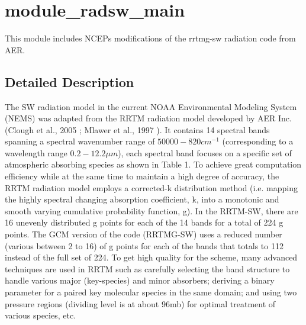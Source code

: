 \hypertarget{group__module__radsw__main}{}\section{module\+\_\+radsw\+\_\+main}
\label{group__module__radsw__main}


This module includes N\+C\+EP\textquotesingle{}s modifications of the rrtmg-\/sw radiation code from A\+ER.  




\subsection{Detailed Description}
The SW radiation model in the current N\+O\+AA Environmental Modeling System (N\+E\+MS) was adapted from the R\+R\+TM radiation model developed by A\+ER Inc. (Clough et al., 2005 \cite{clough_et_al_2005}; Mlawer et al., 1997 \cite{mlawer_et_al_1997}). It contains 14 spectral bands spanning a spectral wavenumber range of $50000-820 cm^{-1}$ (corresponding to a wavelength range $0.2-12.2\mu m$), each spectral band focuses on a specific set of atmospheric absorbing species as shown in Table 1. To achieve great computation efficiency while at the same time to maintain a high degree of accuracy, the R\+R\+TM radiation model employs a corrected-\/k distribution method (i.\+e. mapping the highly spectral changing absorption coefficient, k, into a monotonic and smooth varying cumulative probability function, g). In the R\+R\+T\+M-\/\+SW, there are 16 unevenly distributed g points for each of the 14 bands for a total of 224 g points. The G\+CM version of the code (R\+R\+T\+M\+G-\/\+SW) uses a reduced number (various between 2 to 16) of g points for each of the bands that totals to 112 instead of the full set of 224. To get high quality for the scheme, many advanced techniques are used in R\+R\+TM such as carefully selecting the band structure to handle various major (key-\/species) and minor absorbers; deriving a binary parameter for a paired key molecular species in the same domain; and using two pressure regions (dividing level is at about 96mb) for optimal treatment of various species, etc.

